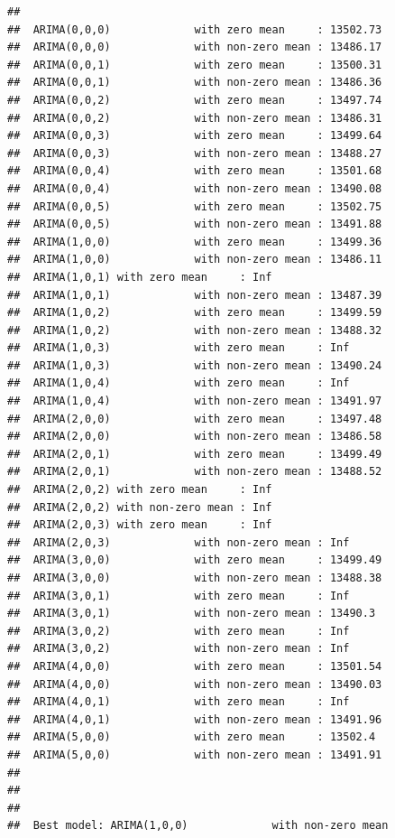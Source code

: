 \documentclass[
]{article}
\begin{document}
\begin{verbatim}
## 
##  ARIMA(0,0,0)             with zero mean     : 13502.73
##  ARIMA(0,0,0)             with non-zero mean : 13486.17
##  ARIMA(0,0,1)             with zero mean     : 13500.31
##  ARIMA(0,0,1)             with non-zero mean : 13486.36
##  ARIMA(0,0,2)             with zero mean     : 13497.74
##  ARIMA(0,0,2)             with non-zero mean : 13486.31
##  ARIMA(0,0,3)             with zero mean     : 13499.64
##  ARIMA(0,0,3)             with non-zero mean : 13488.27
##  ARIMA(0,0,4)             with zero mean     : 13501.68
##  ARIMA(0,0,4)             with non-zero mean : 13490.08
##  ARIMA(0,0,5)             with zero mean     : 13502.75
##  ARIMA(0,0,5)             with non-zero mean : 13491.88
##  ARIMA(1,0,0)             with zero mean     : 13499.36
##  ARIMA(1,0,0)             with non-zero mean : 13486.11
##  ARIMA(1,0,1) with zero mean     : Inf
##  ARIMA(1,0,1)             with non-zero mean : 13487.39
##  ARIMA(1,0,2)             with zero mean     : 13499.59
##  ARIMA(1,0,2)             with non-zero mean : 13488.32
##  ARIMA(1,0,3)             with zero mean     : Inf
##  ARIMA(1,0,3)             with non-zero mean : 13490.24
##  ARIMA(1,0,4)             with zero mean     : Inf
##  ARIMA(1,0,4)             with non-zero mean : 13491.97
##  ARIMA(2,0,0)             with zero mean     : 13497.48
##  ARIMA(2,0,0)             with non-zero mean : 13486.58
##  ARIMA(2,0,1)             with zero mean     : 13499.49
##  ARIMA(2,0,1)             with non-zero mean : 13488.52
##  ARIMA(2,0,2) with zero mean     : Inf
##  ARIMA(2,0,2) with non-zero mean : Inf
##  ARIMA(2,0,3) with zero mean     : Inf
##  ARIMA(2,0,3)             with non-zero mean : Inf
##  ARIMA(3,0,0)             with zero mean     : 13499.49
##  ARIMA(3,0,0)             with non-zero mean : 13488.38
##  ARIMA(3,0,1)             with zero mean     : Inf
##  ARIMA(3,0,1)             with non-zero mean : 13490.3
##  ARIMA(3,0,2)             with zero mean     : Inf
##  ARIMA(3,0,2)             with non-zero mean : Inf
##  ARIMA(4,0,0)             with zero mean     : 13501.54
##  ARIMA(4,0,0)             with non-zero mean : 13490.03
##  ARIMA(4,0,1)             with zero mean     : Inf
##  ARIMA(4,0,1)             with non-zero mean : 13491.96
##  ARIMA(5,0,0)             with zero mean     : 13502.4
##  ARIMA(5,0,0)             with non-zero mean : 13491.91
## 
## 
## 
##  Best model: ARIMA(1,0,0)             with non-zero mean
\end{verbatim}
\end{document}
